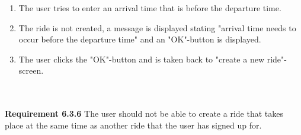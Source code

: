 \documentclass{article}
\begin{document}
\begin{enumerate}
    \item The user tries to enter an arrival time that is before the departure time.
    \item The ride is not created, a message is displayed stating "arrival time needs to occur before the departure time" and an "OK"-button is displayed.
    \item The user clicks the "OK"-button and is taken back to "create a new ride"-screen.
\end{enumerate}
\mbox{}\\ \\
\textbf{Requirement 6.3.6} 
The user should not be able to create a ride that takes place at the same time as another ride that the user has signed up for.
\\ \\
\\ \\
\end{document}

